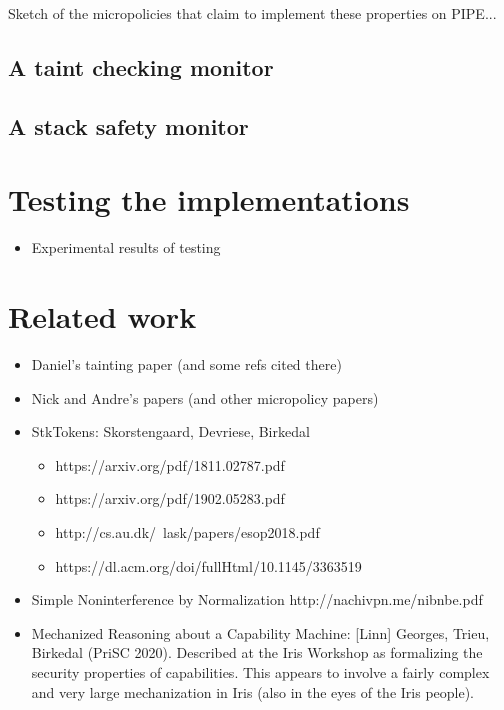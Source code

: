 \documentclass[conference]{IEEEtran}
\begin{document}
Sketch of the micropolicies that claim to implement these properties on
PIPE...

\subsection{A taint checking monitor}

\subsection{A stack safety monitor}

\section{Testing the implementations}

\begin{itemize}
\item Experimental results of testing
\end{itemize}

\section{Related work}

\begin{itemize}
\item Daniel's tainting paper (and some refs cited there)
\item Nick and Andre's papers (and other micropolicy papers)
\item StkTokens: Skorstengaard, Devriese, Birkedal
\begin{itemize}
\item {https://arxiv.org/pdf/1811.02787.pdf}
\item {https://arxiv.org/pdf/1902.05283.pdf}
\item {http://cs.au.dk/~lask/papers/esop2018.pdf}
\item {https://dl.acm.org/doi/fullHtml/10.1145/3363519}
\end{itemize}

\item Simple Noninterference by Normalization {http://nachivpn.me/nibnbe.pdf}

\item Mechanized Reasoning about a Capability Machine: [Linn] Georges,
Trieu, Birkedal (PriSC 2020).
%
Described at the Iris Workshop as formalizing the security properties of
capabilities. This appears to involve a fairly complex and very large
mechanization in Iris (also in the eyes of the Iris people).
\end{itemize}
\end{document}
